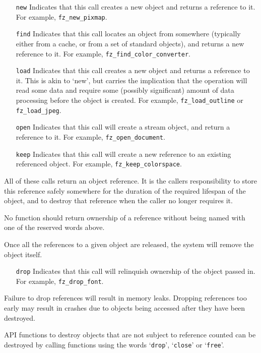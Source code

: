 \documentclass[oneside]{book}
\begin{document}
\begin{itemize}
\item[\texttt{new}] Indicates that this call creates a new object and returns a reference to it. For example, \texttt{fz\_new\_pixmap}.
\item[\texttt{find}] Indicates that this call locates an object from somewhere (typically either from a cache, or from a set of standard objects), and returns a new reference to it. For example, \texttt{fz\_find\_color\_converter}.
\item[\texttt{load}] Indicates that this call creates a new object and returns a reference to it. This is akin to `new', but carries the implication that the operation will read some data and require some (possibly significant) amount of data processing before the object is created. For example, \texttt{fz\_load\_outline} or \texttt{fz\_load\_jpeg}.
\item[\texttt{open}] Indicates that this call will create a stream object, and return a reference to it. For example, \texttt{fz\_open\_document}.
\item[\texttt{keep}] Indicates that this call will create a new reference to an existing referenced object. For example, \texttt{fz\_keep\_colorspace}.
\end{itemize}

All of these calls return an object reference. It is the callers responsibility to store this reference safely somewhere for the duration of the required lifespan of the object, and to destroy that reference when the caller no longer requires it.

No function should return ownership of a reference without being named with one of the reserved words above. 

Once all the references to a given object are released, the system will remove the object itself.

\begin{itemize}
\item[\texttt{drop}] Indicates that this call will relinquish ownership of the object passed in. For example, \texttt{fz\_drop\_font}.
\end{itemize}

Failure to drop references will result in memory leaks. Dropping references too early may result in crashes due to objects being accessed after they have been destroyed.

API functions to destroy objects that are not subject to reference counted can be destroyed by calling functions using the words `\texttt{drop}', `\texttt{close}' or `\texttt{free}'.
\end{document}
